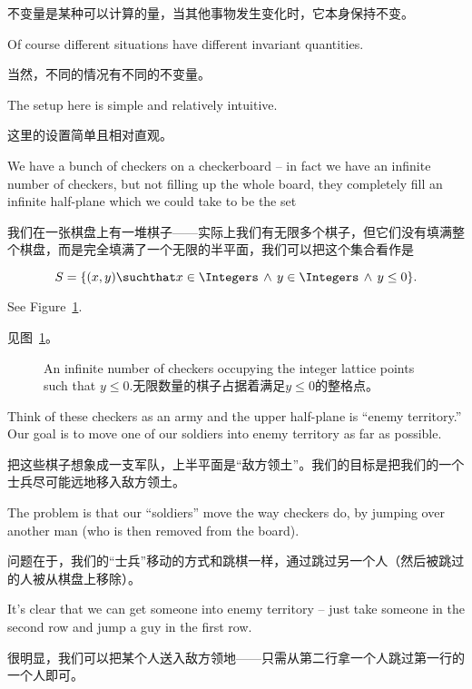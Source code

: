 不变量是某种可以计算的量，当其他事物发生变化时，它本身保持不变。

Of course different situations have different
invariant quantities.  

当然，不同的情况有不同的不变量。

The setup here is simple and relatively intuitive.

这里的设置简单且相对直观。

We have a bunch
of checkers on a checkerboard -- in fact we have an infinite number
of checkers, but not filling up the whole board, they completely fill
an infinite half-plane which we could take to be the set

我们在一张棋盘上有一堆棋子——实际上我们有无限多个棋子，但它们没有填满整个棋盘，而是完全填满了一个无限的半平面，我们可以把这个集合看作是

\[ S = \{(x,y) \suchthat x \in \Integers \, \land \, y \in \Integers \, \land \, y \leq 0 \}. \]

See Figure~\ref{fig:the_army}.
 
见图~\ref{fig:the_army}。

\begin{figure}[!hbtp] 
\begin{center}

\end{center}
\caption[An infinite army in the lower half-plane.下半平面中的无限军队。]{An infinite number of
checkers occupying the integer lattice points such that $y\leq 0$.无限数量的棋子占据着满足$y\leq 0$的整格点。}
\label{fig:the_army}
\end{figure}
  
Think of these checkers as an army and the upper half-plane is ``enemy 
territory.''  Our goal is to move one of our soldiers into enemy territory
as far as possible.

把这些棋子想象成一支军队，上半平面是“敌方领土”。我们的目标是把我们的一个士兵尽可能远地移入敌方领土。

The problem is that our ``soldiers'' move the 
way checkers do, by jumping over another man (who is then removed from 
the board).

问题在于，我们的“士兵”移动的方式和跳棋一样，通过跳过另一个人（然后被跳过的人被从棋盘上移除）。

It's clear that we can get someone into enemy territory --
just take someone in the second row and jump a guy in the first row.

很明显，我们可以把某个人送入敌方领地——只需从第二行拿一个人跳过第一行的一个人即可。

